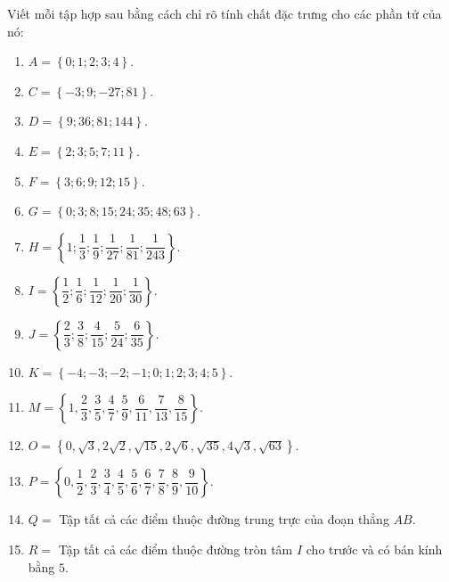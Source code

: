 \begin{bt}%
	Viết mỗi tập hợp sau bằng cách chỉ rõ tính chất đặc trưng cho các phần tử  của nó:
	\begin{enumerate}
		 \item $A=\left\{{0;1;2;3;4}\right\}$.
		\item  $C=\left\{{-3;9;-27;81}\right\}$.
		 \item $D=\left\{{9;36;81;144}\right\}$.
		\item  $E=\left\{{2;3;5;7;11}\right\}$.
		 \item $F=\left\{{3;6;9;12;15}\right\}$.
		\item  $G=\left\{{0;3;8;15;24;35;48;63}\right\}$.
		\item $H=\left\{{1;\dfrac{1}{3};\dfrac{1}{9};\dfrac{1}{27};\dfrac{1}{81};\dfrac{1}{243}}\right\}$. 
		 \item $I=\left\{{\dfrac{1}{2};\dfrac{1}{6};\dfrac{1}{12};\dfrac{1}{20};\dfrac{1}{30}}\right\}$.
		\item  $J=\left\{{\dfrac{2}{3};\dfrac{3}{8};\dfrac{4}{15};\dfrac{5}{24};\dfrac{6}{35}}\right\}$.
		\item $K=\left\{{-4;-3;-2;-1;0;1;2;3;4;5}\right\}$. 
		\item $M=\left\{{1,\dfrac{2}{3},\dfrac{3}{5},\dfrac{4}{7},\dfrac{5}{9},\dfrac{6}{11},\dfrac{7}{13},\dfrac{8}{15}}\right\}$. 
		\item  $O=\left\{{0,\sqrt{3},2\sqrt{2},\sqrt{15},2\sqrt{6},\sqrt{35},4\sqrt{3},\sqrt{63}}\right\}$.
		\item $P=\left\{{0,\dfrac{1}{2},\dfrac{2}{3},\dfrac{3}{4},\dfrac{4}{5},\dfrac{5}{6},\dfrac{6}{7},\dfrac{7}{8},\dfrac{8}{9},\dfrac{9}{10}}\right\}$. 
		\item $Q=$ Tập tất cả các điểm  thuộc đường trung trực của đoạn thẳng $AB$.
		\item $R=$ Tập tất cả các điểm thuộc đường tròn tâm $I$ cho trước và có bán kính bằng $5$. 
	\end{enumerate}
\end{bt}
